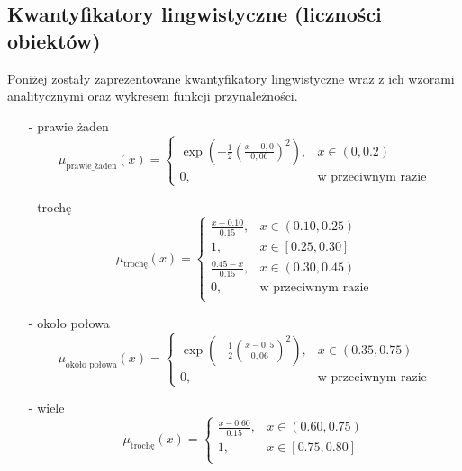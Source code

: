 \documentclass{article}
\begin{document}
\subsection{Kwantyfikatory lingwistyczne (liczności obiektów)}
Poniżej zostały zaprezentowane kwantyfikatory lingwistyczne wraz z ich wzorami analitycznymi oraz wykresem funkcji przynależności.
\begin{itemize}
    \item[-] prawie żaden
        \begin{equation}
            \mu_{\text{prawie\_żaden}}(x) =
        \begin{cases}
        \exp\left( -\frac{1}{2} \left( \frac{x - 0{,}0}{0,06} \right)^2 \right), & x \in (0, 0.2) \\
        0, & \text{w przeciwnym razie}
        \end{cases}
        \end{equation}
    \item[-] trochę
        \begin{equation}
            \mu_{\text{trochę}}(x) =
            \begin{cases}
            \frac{x - 0.10}{0.15}, & x \in (0.10, 0.25) \\
            1, & x \in [0.25, 0.30] \\
            \frac{0.45 - x}{0.15}, & x \in (0.30, 0.45)\\
            0, & \text{w przeciwnym razie} \\
            \end{cases}
        \end{equation}
    \item[-] około połowa
        \begin{equation}
        \mu_{\text{około połowa}}(x) =
        \begin{cases}
        \exp\left( -\frac{1}{2} \left( \frac{x - 0{,}5}{0,06} \right)^2 \right), & x \in (0.35, 0.75) \\
        0, & \text{w przeciwnym razie}
\end{cases}
        \end{equation}
    \item[-] wiele
        \begin{equation}
             \mu_{\text{trochę}}(x) =
            \begin{cases}
            \frac{x - 0.60}{0.15}, & x \in (0.60, 0.75) \\
            1, & x \in [0.75, 0.80] \\

\end{cases}
\end{equation}
\end{itemize}
\end{document}
